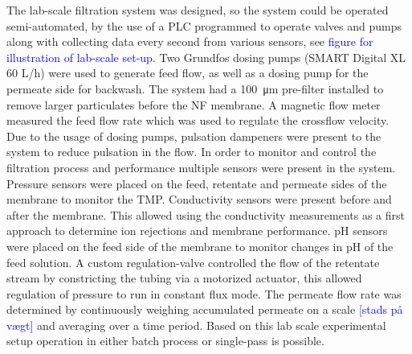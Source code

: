 The lab-scale filtration system was designed, 
so the system could be operated semi-automated, by the use of a PLC programmed to operate valves and pumps along with collecting data every second from various sensors, see \textcolor{blue}{figure for illustration of lab-scale set-up}.
Two Grundfos dosing pumps (SMART Digital XL 60 L/h) were used to generate feed flow, as well as a dosing pump for the permeate side for backwash.
The system had a \SI{100}{\micro\meter} pre-filter installed to remove larger particulates before the NF membrane.
A magnetic flow meter measured the feed flow rate which was used to regulate the crossflow velocity.
Due to the usage of dosing pumps, pulsation dampeners were present to the system to reduce pulsation in the flow.
In order to monitor and control the filtration process and performance multiple sensors were present in the system. 
Pressure sensors were placed on the feed, retentate and permeate sides of the membrane to monitor the TMP. 
Conductivity sensors were present before and after the membrane.
This allowed using the conductivity measurements as a first approach to determine ion rejections and membrane performance. 
pH sensors were placed on the feed side of the membrane to monitor changes in pH of the feed solution. 
A custom regulation-valve controlled the flow of the retentate stream by constricting the tubing via a motorized actuator, this allowed regulation of pressure to run in constant flux mode. 
The permeate flow rate was determined by continuously weighing accumulated permeate on a scale \textcolor{blue}{[stads på vægt]} and averaging over a time period.  
Based on this lab scale experimental setup operation in either batch process or single-pass is possible.




